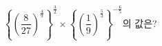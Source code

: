 $\left\{\left(\dfrac{8}{27}\right)^{\frac{4}{9}}\right\}^{\frac{3}{2}}\times\left\{\left(\dfrac{1}{9}\right)^{\frac{5}{3}}\right\}^{-\frac{6}{5}}$의 값은?
